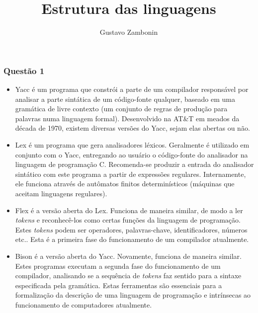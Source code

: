 \documentclass{../sftex/sftex}
\title{Estrutura das linguagens}
\author{Gustavo Zambonin}
\begin{document}
\maketitle

\subsubsection*{Questão 1}
\begin{itemize}
    \item Yacc é um programa que constrói a parte de um compilador responsável
    por analisar a parte sintática de um código-fonte qualquer, baseado em uma
    gramática de livre contexto (um conjunto de regras de produção para palavras
    numa linguagem formal). Desenvolvido na AT\&T em meados da década de 1970,
    existem diversas versões do Yacc, sejam elas abertas ou não.

    \item Lex é um programa que gera analisadores léxicos. Geralmente é
    utilizado em conjunto com o Yacc, entregando ao usuário o código-fonte do
    analisador na linguagem de programação C. Recomenda-se produzir a entrada do
    analisador sintático com este programa a partir de expressões regulares.
    Internamente, ele funciona através de autômatos finitos determinísticos
    (máquinas que aceitam linguagens regulares).

    \item Flex é a versão aberta do Lex. Funciona de maneira similar, de modo a
    ler \emph{tokens} e reconhecê-los como certas funções da linguagem de
    programação. Estes \emph{tokens} podem ser operadores, palavras-chave,
    identificadores, números etc.. Esta é a primeira fase do funcionamento de um
    compilador atualmente.

    \item Bison é a versão aberta do Yacc. Novamente, funciona de maneira
    similar. Estes programas executam a segunda fase do funcionamento de um
    compilador, analisando se a sequência de \emph{tokens} faz sentido para a
    sintaxe especificada pela gramática. Estas ferramentas são essenciais para a
    formalização da descrição de uma linguagem de programação e intrínsecas ao
    funcionamento de computadores atualmente.
\end{itemize}
\end{document}
